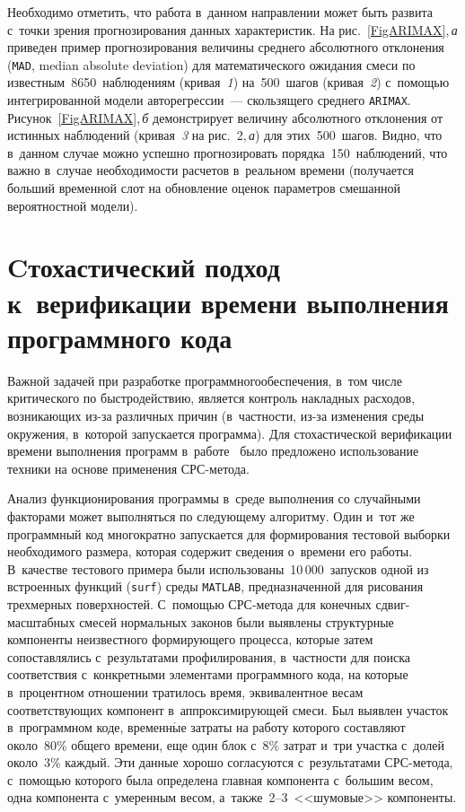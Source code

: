 \begin{multicols}{2}
Необходимо отметить, что работа в~данном направлении может быть развита с~точки 
зрения прогнозирования данных характеристик. На рис.~\ref{FigARIMAX},\,\textit{а}
 приведен 
пример прогнозирования величины среднего абсолютного отклонения (\verb"MAD", 
median absolute deviation) для математического ожидания смеси по 
известным~8650~наблюдениям (кривая~\textit{1}) на~500~шагов (кривая~\textit{2}) 
с~по\-мощью интегрированной модели авторегрессии~--- 
скользящего среднего \verb"ARIMAX". Рисунок~\ref{FigARIMAX},\,\textit{б} 
демонстрирует величину абсолютного отклонения от истинных наблюдений 
(кривая~\textit{3} на рис.~2,\,\textit{а}) для этих~500~шагов. Видно, что в~данном случае можно 
успешно прогнозировать порядка~150~наблюдений, что важно в~случае необходимости 
расчетов в~реальном времени (получается больший временной слот на обновление 
оценок па\-ра\-мет\-ров смешанной вероятностной модели).


\section{Cтохастический подход к~верификации времени выполнения программного кода}

Важной задачей при разработке программного\linebreak обеспечения, в~том числе 
критического по быст\-ро\-дей\-ст\-вию, является контроль накладных расходов, 
возникающих из-за различных причин (в~част\-ности, из-за изменения среды окружения, 
\mbox{в~которой} запускается программа). Для стохастической верификации времени 
выполнения программ в~работе~\cite{Gorshenin2016ICNAAM2} было предложено 
использование техники на основе применения СРС-ме\-тода.

Анализ функционирования программы в~среде выполнения со случайными факторами 
может выполняться по следующему алгоритму. Один и~тот же программный код многократно 
запускается для формирования тестовой выборки необходимого размера, которая 
содержит сведения о~времени его работы. В~качестве тестового примера были 
использованы~10\,000~запусков одной из встроенных функций (\verb"surf") 
среды \verb"MATLAB", предназначенной для рисования трехмерных поверхностей. 
С~по\-мощью СРС-ме\-то\-да для конечных сдвиг-мас\-штаб\-ных 
смесей нормальных законов были выявлены структурные компоненты неизвестного 
формирующего процесса, которые затем сопоставлялись с~результатами профилирования, 
в~част\-ности для поиска соответствия с~конкретными элементами программного кода, 
на которые в~процентном отношении тратилось время, эквивалентное весам 
соответствующих компонент в~аппроксимирующей смеси. Был выявлен участок в~программном 
коде, временн$\acute{\mbox{ы}}$е затраты на работу которого составляют около~80\% общего времени, 
еще один блок с~8\% затрат и~три участка с~долей около~3\% каждый. 
Эти данные хорошо согласуются с~результатами СРС-ме\-то\-да, 
с~по\-мощью которого была определена главная компонента с~большим весом, 
одна компонента с~умеренным весом, а~также~2--3~<<шумовые>> компоненты.


\end{multicols}
